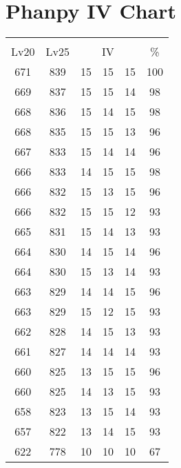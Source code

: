 \documentclass{article}%
\begin{document}
%
\normalsize%
\section{Phanpy IV Chart}%
\label{sec:Phanpy IV Chart}%
\renewcommand{\arraystretch}{1.5}%
\begin{tabular}{|c|c|c|c|c|c|}%
\hline%
\multicolumn{6}{|c|}{\textcolor{white}{ 
\linebreak{Phanpy}
}%
\cellcolor{black}}\\%
\multicolumn{1}{|c}{Lv20}&\multicolumn{1}{c|}{Lv25}&\multicolumn{3}{c|}{IV}&\multicolumn{1}{|c|}{\%}\\%
\hline%
\rowcolor{color100}%
671&839&15&15&15&100\\%
\hline%
\rowcolor{color98}%
669&837&15&15&14&98\\%
\hline%
\rowcolor{color98}%
668&836&15&14&15&98\\%
\hline%
\rowcolor{color96}%
668&835&15&15&13&96\\%
\hline%
\rowcolor{color96}%
667&833&15&14&14&96\\%
\hline%
\rowcolor{color98}%
666&833&14&15&15&98\\%
\hline%
\rowcolor{color96}%
666&832&15&13&15&96\\%
\hline%
\rowcolor{color93}%
666&832&15&15&12&93\\%
\hline%
\rowcolor{color93}%
665&831&15&14&13&93\\%
\hline%
\rowcolor{color96}%
664&830&14&15&14&96\\%
\hline%
\rowcolor{color93}%
664&830&15&13&14&93\\%
\hline%
\rowcolor{color96}%
663&829&14&14&15&96\\%
\hline%
\rowcolor{color93}%
663&829&15&12&15&93\\%
\hline%
\rowcolor{color93}%
662&828&14&15&13&93\\%
\hline%
\rowcolor{color93}%
661&827&14&14&14&93\\%
\hline%
\rowcolor{color96}%
660&825&13&15&15&96\\%
\hline%
\rowcolor{color93}%
660&825&14&13&15&93\\%
\hline%
\rowcolor{color93}%
658&823&13&15&14&93\\%
\hline%
\rowcolor{color93}%
657&822&13&14&15&93\\%
\hline%
\rowcolor{color91}%
622&778&10&10&10&67\\%
\end{tabular}

%
\end{document}

